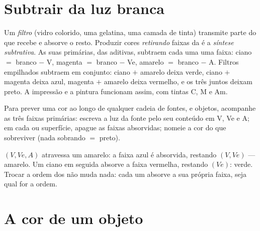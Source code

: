 \section{Subtrair da luz branca}

\begin{definition}\label{def:g11:color-light-sources:subtractive}
Um \emph{filtro} (vidro colorido, uma gelatina, uma camada
de tinta) transmite parte do  que recebe e absorve o resto.
Produzir cores \emph{retirando} faixas da  é a \emph{síntese
subtrativa}. As suas primárias, 
das aditivas, subtraem cada uma uma faixa: ciano $=$ branco $-$ V,
magenta $=$ branco $-$ Ve, amarelo $=$ branco $-$ A. Filtros empilhados
subtraem em conjunto: ciano $+$ amarelo deixa verde, ciano $+$ magenta
deixa azul, magenta $+$ amarelo deixa vermelho, e os três juntos deixam
preto. A impressão e a pintura funcionam assim, com tintas C, M e Am.
\end{definition}

\begin{method}\label{met:g11:color-light-sources:bookkeeping}
Para prever uma cor ao longo de qualquer cadeia de fontes,  e
objetos, acompanhe as três faixas primárias: escreva a luz da fonte pelo
seu conteúdo em V, Ve e A; em cada  ou superfície, apague as faixas
absorvidas; nomeie a cor do que sobreviver (nada sobrando $=$ preto).
\end{method}

\begin{example}\label{ex:g11:color-light-sources:chain}
 $(V, Ve, A)$ atravessa um  amarelo: a faixa azul é
absorvida, restando $(V, Ve)$ --- amarelo. Um  ciano em seguida
absorve a faixa vermelha, restando $(Ve)$: verde. Trocar a ordem dos
 não muda nada: cada um absorve a sua própria faixa, seja qual for
a ordem.
\end{example}

\section{A cor de um objeto}

